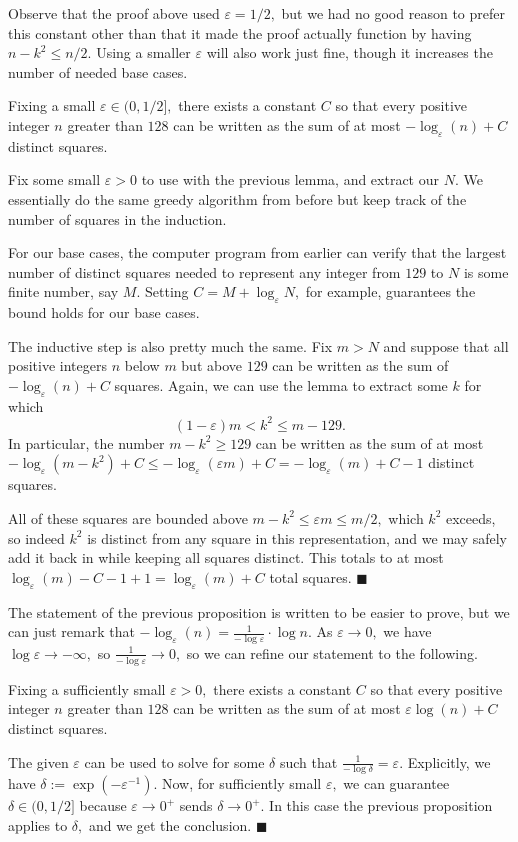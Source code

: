 Observe that the proof above used $\varepsilon=1/2,$ but we had no good reason to prefer this constant other than that it made the proof actually function by having $n-k^2\le n/2.$ Using a smaller $\varepsilon$ will also work just fine, though it increases the number of needed base cases.
\begin{proposition}
    Fixing a small $\varepsilon\in(0,1/2],$ there exists a constant $C$ so that every positive integer $n$ greater than $128$ can be written as the sum of at most $-\log_\varepsilon(n)+C$ distinct squares.
\end{proposition}
Fix some small $\varepsilon>0$ to use with the previous lemma, and extract our $N.$ We essentially do the same greedy algorithm from before but keep track of the number of squares in the induction.

For our base cases, the computer program from earlier can verify that the largest number of distinct squares needed to represent any integer from $129$ to $N$ is some finite number, say $M.$ Setting $C=M+\log_\varepsilon N,$ for example, guarantees the bound holds for our base cases.

The inductive step is also pretty much the same. Fix $m>N$ and suppose that all positive integers $n$ below $m$ but above $129$ can be written as the sum of $-\log_\varepsilon(n)+C$ squares. Again, we can use the lemma to extract some $k$ for which
\[(1-\varepsilon)m<k^2\le m-129.\]
In particular, the number $m-k^2\ge129$ can be written as the sum of at most $-\log_\varepsilon\left(m-k^2\right)+C\le-\log_\varepsilon(\varepsilon m)+C=-\log_\varepsilon(m)+C-1$ distinct squares.

All of these squares are bounded above $m-k^2\le\varepsilon m\le m/2,$ which $k^2$ exceeds, so indeed $k^2$ is distinct from any square in this representation, and we may safely add it back in while keeping all squares distinct. This totals to at most $\log_\varepsilon(m)-C-1+1=\log_\varepsilon(m)+C$ total squares. $\blacksquare$

The statement of the previous proposition is written to be easier to prove, but we can just remark that $-\log_\varepsilon(n)=\frac1{-\log\varepsilon}\cdot\log n.$ As $\varepsilon\to0,$ we have $\log\varepsilon\to-\infty,$ so $\frac1{-\log\varepsilon}\to0,$ so we can refine our statement to the following.
\begin{proposition}
    Fixing a sufficiently small $\varepsilon>0,$ there exists a constant $C$ so that every positive integer $n$ greater than $128$ can be written as the sum of at most $\varepsilon\log(n)+C$ distinct squares.
\end{proposition}
The given $\varepsilon$ can be used to solve for some $\delta$ such that $\frac1{-\log\delta}=\varepsilon.$ Explicitly, we have $\delta:=\exp\left(-\varepsilon^{-1}\right).$ Now, for sufficiently small $\varepsilon,$ we can guarantee $\delta\in(0,1/2]$ because $\varepsilon\to0^+$ sends $\delta\to0^+.$ In this case the previous proposition applies to $\delta,$ and we get the conclusion. $\blacksquare$

